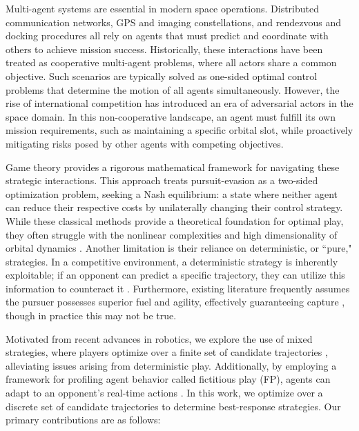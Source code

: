 Multi-agent systems are essential in modern space operations. Distributed communication networks, GPS and imaging constellations, and rendezvous and docking procedures all rely on agents that must predict and coordinate with others to achieve mission success. Historically, these interactions have been treated as cooperative multi-agent problems, where all actors share a common objective. Such scenarios are typically solved as one-sided optimal control problems that determine the motion of all agents simultaneously. However, the rise of international competition has introduced an era of adversarial actors in the space domain. In this non-cooperative landscape, an agent must fulfill its own mission requirements, such as maintaining a specific orbital slot, while proactively mitigating risks posed by other agents with competing objectives.

Game theory provides a rigorous mathematical framework for navigating these strategic interactions. This approach treats pursuit-evasion as a two-sided optimization problem, seeking a Nash equilibrium: a state where neither agent can reduce their respective costs by unilaterally changing their control strategy. While these classical methods provide a theoretical foundation for optimal play, they often struggle with the nonlinear complexities and high dimensionality of orbital dynamics \cite{fu_analytical_2025} \cite{jia_approximate_2025}.
Another limitation is their reliance on deterministic, or ``pure," strategies. In a competitive environment, a deterministic strategy is inherently exploitable; if an opponent can predict a specific trajectory, they can utilize this information to counteract it \cite{peters2022learning}. Furthermore, existing literature frequently assumes the pursuer possesses superior fuel and agility, effectively guaranteeing capture \cite{venigalla2018spacecraft} \cite{pontani2009numerical}, though in practice this may not be true. 


Motivated from recent advances in robotics, we explore the use of mixed strategies, where players optimize over a finite set of candidate trajectories \cite{peters2022learning} \cite{hanlongResearchStrategiesMultiSpacecraft2024}, alleviating issues arising from deterministic play. 
% 
Additionally, by employing a framework for profiling agent behavior called fictitious play (FP), 
% 
% 
agents can adapt to an opponent’s real-time actions \cite{albrechtReasoningHypotheticalAgent}. 
% 
In this work, we optimize over a discrete set of candidate trajectories to determine best-response strategies. Our primary contributions are as follows:

